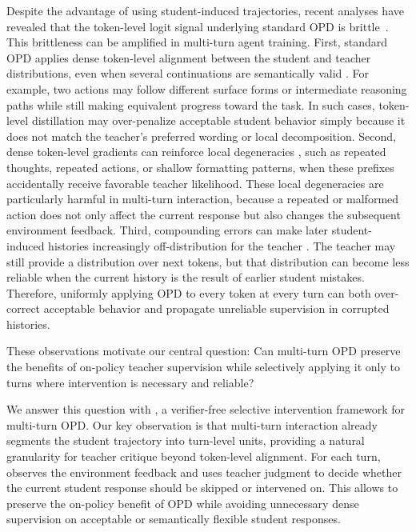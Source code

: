 Despite the advantage of using student-induced trajectories, recent analyses have revealed that the token-level logit signal underlying standard OPD is brittle~\citep{li2026rethinking, luo2026demystifying}.
%
This brittleness can be amplified in multi-turn agent training.
%
First, standard OPD applies dense token-level alignment between the student and teacher distributions, even when several continuations are semantically valid \citep{li2026rethinking}.
%
For example, two actions may follow different surface forms or intermediate reasoning paths while still making equivalent progress toward the task.
%
In such cases, token-level distillation may over-penalize acceptable student behavior simply because it does not match the teacher's preferred wording or local decomposition.
%
Second, dense token-level gradients can reinforce local degeneracies \citep{luo2026demystifying}, such as repeated thoughts, repeated actions, or shallow formatting patterns, when these prefixes accidentally receive favorable teacher likelihood.
%
These local degeneracies are particularly harmful in multi-turn interaction, because a repeated or malformed action does not only affect the current response but also changes the subsequent environment feedback.
%
Third, compounding errors can make later student-induced histories increasingly off-distribution for the teacher \citep{li2025beyond}.
%
The teacher may still provide a distribution over next tokens, but that distribution can become less reliable when the current history is the result of earlier student mistakes.
%
Therefore, uniformly applying OPD to every token at every turn can both over-correct acceptable behavior and propagate unreliable supervision in corrupted histories.

These observations motivate our central question:
%
Can multi-turn OPD preserve the benefits of on-policy teacher supervision while selectively applying it only to turns where intervention is necessary and reliable?
%

We answer this question with \textbf{\ours{}}, a verifier-free selective intervention framework for multi-turn OPD.
%
Our key observation is that multi-turn interaction already segments the student trajectory into turn-level units, providing a natural granularity for teacher critique beyond token-level alignment.
%
For each turn, \ours{} observes the environment feedback and uses teacher judgment to decide whether the current student response should be skipped or intervened on.
%
This allows \ours{} to preserve the on-policy benefit of OPD while avoiding unnecessary dense supervision on acceptable or semantically flexible student responses.

